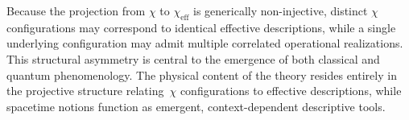  Because the projection from $\chi$ to $\chi_{\mathrm{eff}}$ is generically
  non-injective, distinct $\chi$ configurations may correspond to identical
  effective descriptions, while a single underlying configuration may admit
  multiple correlated operational realizations.
  This structural asymmetry is central to the emergence of both classical and
  quantum phenomenology.
  The physical content of the theory resides entirely in the projective
  structure relating~$\chi$ configurations to effective descriptions, while
  spacetime notions function as emergent, context-dependent descriptive tools.
